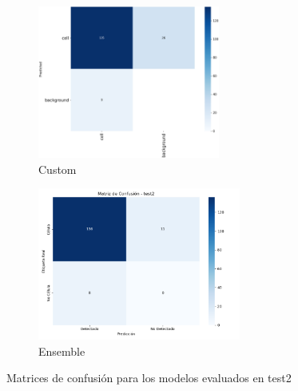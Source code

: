 \documentclass[12pt,a4paper,onecolumn,oneside]{report}
\begin{document}
\begin{figure}[H]
  \vspace{0.1cm}
  \begin{subfigure}[b]{0.45\textwidth}
    \centering
    \includegraphics[height=5cm]{figuras/resultados experimentacion/custom/test2/confusion_matrix.png}
    \vspace{-0.3cm}
    \caption{\footnotesize Custom}
    \label{fig:confusion_custom_test2}
  \end{subfigure}
  \hfill
  \begin{subfigure}[b]{0.45\textwidth}
    \centering
    \includegraphics[height=5cm]{figuras/resultados experimentacion/ensemble/confusion_matrices/confusion_matrix_test2.png}
    \vspace{-0.3cm}
    \caption{\footnotesize Ensemble}
    \label{fig:confusion_ensemble_test2}
  \end{subfigure}
  
  \vspace{-0.2cm}
  \caption{Matrices de confusión para los modelos evaluados en test2}
  \label{fig:confusion_matrices_test2}
\end{figure}
\end{document}
